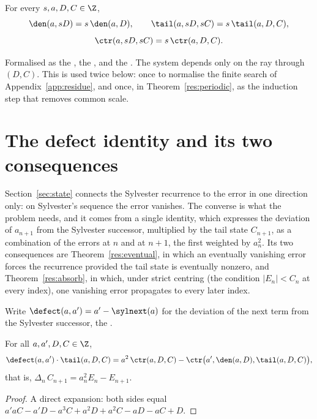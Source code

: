 \begin{proposition}\label{res:scale}
For every $s,a,D,C\in\Z$,
\[
 \den(a,sD)=s\,\den(a,D),\qquad
 \tail(a,sD,sC)=s\,\tail(a,D,C),
\]
\[
 \ctr(a,sD,sC)=s\,\ctr(a,D,C).
\]
\end{proposition}

\noindent Formalised as the
, the
, and the
.  The system depends only on the ray through $(D,C)$.  This is
used twice below: once to normalise the finite search of
Appendix~\ref{app:residue}, and once, in Theorem~\ref{res:periodic}, as the
induction step that removes common scale.

\section{The defect identity and its two consequences}\label{sec:defect}

Section~\ref{sec:state} connects the Sylvester recurrence to the error in one
direction only: on Sylvester's sequence the error vanishes.  The converse is
what the problem needs, and it comes from a single identity, which expresses
the deviation of $a_{n+1}$
from the Sylvester successor, multiplied by the tail state $C_{n+1}$, as a
combination of the errors at $n$ and at $n+1$, the first weighted by
$a_n^{2}$.  Its two consequences are
Theorem~\ref{res:eventual}, in which an eventually vanishing error forces the
recurrence provided the tail state is eventually nonzero, and
Theorem~\ref{res:absorb}, in which, under strict centring (the condition
$|E_n|<C_n$ at every index), one vanishing error propagates to every later
index.

Write $\defect(a,a')=a'-\sylnext(a)$ for the deviation of the next term from
the Sylvester successor, the
.

\begin{theorem}\label{res:defect}
For all $a,a',D,C\in\Z$,
\[
 \defect(a,a')\cdot\tail(a,D,C)
 =a^{2}\,\ctr(a,D,C)-\ctr\bigl(a',\den(a,D),\tail(a,D,C)\bigr),
\]
that is, $\Delta_n\,C_{n+1}=a_n^{2}E_n-E_{n+1}$.
\end{theorem}

\begin{proof}
A direct expansion: both sides equal
$a'aC-a'D-a^{3}C+a^{2}D+a^{2}C-aD-aC+D$.
\end{proof}

